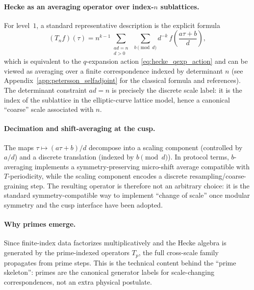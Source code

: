 \paragraph{Hecke as an averaging operator over index-\texorpdfstring{$n$}{n} sublattices.}
For level~$1$, a standard representative description is the explicit formula
\begin{equation}
(T_n f)(\tau)
=
n^{k-1}\sum_{\substack{ad=n\\ d>0}}\;\sum_{b\!\!\!\pmod d}
d^{-k}\,
f\!\left(\frac{a\tau+b}{d}\right),
\label{eq:hecke_coset_average}
\end{equation}
which is equivalent to the $q$-expansion action \eqref{eq:hecke_qexp_action} and can be viewed as averaging over a finite correspondence indexed by determinant $n$ (see Appendix~\ref{app:petersson_selfadjoint} for the classical formula and references). The determinant constraint $ad=n$ is precisely the discrete scale label: it is the index of the sublattice in the elliptic-curve lattice model, hence a canonical ``coarse'' scale associated with $n$.

\paragraph{Decimation and shift-averaging at the cusp.}
The maps $\tau\mapsto (a\tau+b)/d$ decompose into a scaling component (controlled by $a/d$) and a discrete translation (indexed by $b\!\!\!\pmod d$). In protocol terms, $b$-averaging implements a symmetry-preserving micro-shift average compatible with $T$-periodicity, while the scaling component encodes a discrete resampling/coarse-graining step. The resulting operator is therefore not an arbitrary choice: it is the standard symmetry-compatible way to implement ``change of scale'' once modular symmetry and the cusp interface have been adopted.

\paragraph{Why primes emerge.}
Since finite-index data factorizes multiplicatively and the Hecke algebra is generated by the prime-indexed operators $T_p$, the full cross-scale family propagates from prime steps. This is the technical content behind the ``prime skeleton'': primes are the canonical generator labels for scale-changing correspondences, not an extra physical postulate.

